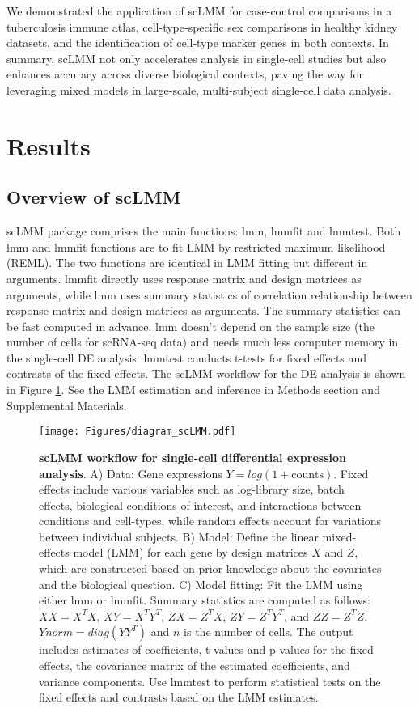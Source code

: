 \documentclass[
]{article}
\begin{document}
We demonstrated the application of scLMM for case-control comparisons in
a tuberculosis immune atlas, cell-type-specific sex comparisons in
healthy kidney datasets, and the identification of cell-type marker
genes in both contexts. In summary, scLMM not only accelerates analysis
in single-cell studies but also enhances accuracy across diverse
biological contexts, paving the way for leveraging mixed models in
large-scale, multi-subject single-cell data analysis.

\hypertarget{results}{%
\section{Results}\label{results}}

\hypertarget{overview-of-sclmm}{%
\subsection{Overview of scLMM}\label{overview-of-sclmm}}

scLMM package comprises the main functions: lmm, lmmfit and lmmtest.
Both lmm and lmmfit functions are to fit LMM by restricted maximum
likelihood (REML). The two functions are identical in LMM fitting but
different in arguments. lmmfit directly uses response matrix and design
matrices as arguments, while lmm uses summary statistics of correlation
relationship between response matrix and design matrices as arguments.
The summary statistics can be fast computed in advance. lmm doesn't
depend on the sample size (the number of cells for scRNA-seq data) and
needs much less computer memory in the single-cell DE analysis. lmmtest
conducts t-tests for fixed effects and contrasts of the fixed effects.
The scLMM workflow for the DE analysis is shown in Figure
\ref{fig:scLMM}. See the LMM estimation and inference in Methods section
and Supplemental Materials.

\begin{figure}
\centering
\texttt{[image: Figures/diagram\_scLMM.pdf]}
\caption{\textbf{scLMM workflow for single-cell differential expression
analysis}. A) Data: Gene expressions \(Y = log(1 + \text{counts})\).
Fixed effects include various variables such as log-library size, batch
effects, biological conditions of interest, and interactions between
conditions and cell-types, while random effects account for variations
between individual subjects. B) Model: Define the linear mixed-effects
model (LMM) for each gene by design matrices \(X\) and \(Z\), which are
constructed based on prior knowledge about the covariates and the
biological question. C) Model fitting: Fit the LMM using either lmm or
lmmfit. Summary statistics are computed as follows: \(XX = X^TX\),
\(XY = X^TY^T\), \(ZX = Z^TX\), \(ZY = Z^TY^T\), and \(ZZ = Z^TZ\).
\(Ynorm = diag(YY^T)\) and \(n\) is the number of cells. The output
includes estimates of coefficients, t-values and p-values for the fixed
effects, the covariance matrix of the estimated coefficients, and
variance components. Use lmmtest to perform statistical tests on the
fixed effects and contrasts based on the LMM
estimates.\label{fig:scLMM}}
\end{figure}
\end{document}
